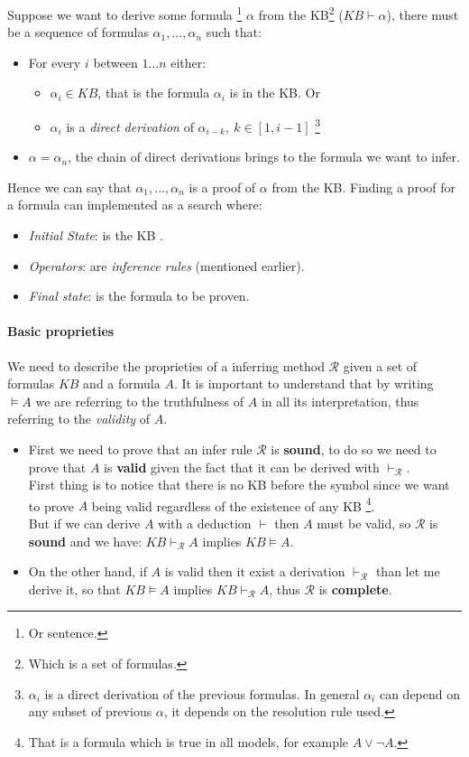 \documentclass[10pt,a4paper]{article}
\begin{document}
Suppose we want to derive some formula \footnote{Or sentence.} $\alpha$ from the KB\footnote{Which is a set of formulas.} ($KB \vdash \alpha$), there must be a sequence of formulas $\alpha_1,...,\alpha_n$ such that:
\begin{itemize}
\item For every $i$ between $1...n$ either:
	\begin{itemize}
	\item $\alpha_i\in KB$, that is the formula $\alpha_i$ is in the KB. Or
	\item  $\alpha_i$ is a \textit{direct derivation} of $\alpha_{i-k},\ k\in [1,i-1]$ \footnote{$\alpha_i$  is a direct derivation of the previous formulas. In general $\alpha_i$ can depend on any subset of previous $\alpha$, it depends on the resolution rule used. }
	\end{itemize}
\item $\alpha=\alpha_n$, the chain of direct derivations brings to the formula we want to infer.
\end{itemize} 
Hence we can say that $\alpha_1,...,\alpha_n$ is a proof of $\alpha$ from the KB.
Finding a proof for a formula can implemented as a search where:
\begin{itemize}
\item \textit{Initial State}: is the KB  .
\item \textit{Operators}: are \textit{inference rules} (mentioned earlier).
\item \textit{Final state}: is the formula to be proven.

\end{itemize}



\paragraph{Basic proprieties}
We need to describe the proprieties of a inferring method $\mathcal{R}$ given a set of formulas $KB$ and a formula $A$. It is important to understand that by writing $\models A$ we are referring to the truthfulness of $A$ in all its interpretation, thus referring to the \textit{validity} of $A$.
\begin{itemize}
\item First we need to prove that an infer rule $\mathcal{R}$ is \textbf{sound}, to do so we need to prove that $A$ is \textbf{valid} given the fact that it can be derived with $\vdash_{\mathcal{R}}$.\\ 
First thing is to notice that there is no KB before the symbol since we want to prove $A$ being valid  regardless of the existence of any KB \footnote{That is a formula which is true in all models, for example $A \vee \neg A$.}.\\
But if we can derive $A$ with a deduction $\vdash$ then $A$ must be valid, so $\mathcal{R}$ is \textbf{sound} and we have: $KB \vdash_{\mathcal{R}} A$ implies $KB \models A$.
\item On the other hand, if $A$ is valid then it exist a derivation $\vdash_{\mathcal{R}} $ than let me derive it, so that $KB \models A$ implies $KB \vdash_{\mathcal{R}} A$, thus  $\mathcal{R}$ is \textbf{complete}.
\end{itemize}
\end{document}
